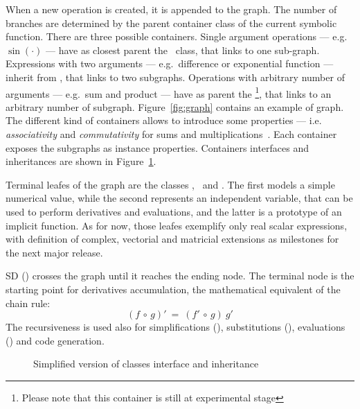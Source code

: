 When a new operation is created, it is appended to the graph. The number of branches are determined by the parent container class of the current symbolic function. There are three possible containers. Single argument operations --- e.g. $\sin(\cdot)$ --- have as closest parent the \CASOp~class, that links to one sub-graph. Expressions with two arguments --- e.g.\ difference or exponential function --- inherit from \CASBinaryOp, that links to two subgraphs. Operations with arbitrary number of arguments --- e.g.\ sum and product --- have as parent the \CASNaryOp\footnote{Please note that this container is still at experimental stage}, that links to an arbitrary number of subgraph. Figure~\ref{fig:graph} contains an example of graph. The different kind of containers allows to introduce some properties --- i.e. \emph{associativity} and \emph{commutativity} for sums and multiplications~\cite{cohen2003computer}. Each container exposes the subgraphs as instance properties. Containers interfaces and inheritances are shown in Figure~\ref{fig:uml-container}. %

Terminal leafes of the graph are the classes \CASConstant, \CASVariable~and \CASFunction. The first models a simple numerical value, while the second represents an independent variable, that can be used to perform derivatives and evaluations, and the latter is a prototype of an implicit function. As for now, those leafes exemplify only real scalar expressions, with definition of complex, vectorial and matricial extensions as milestones for the next major release.

SD (\CASOpdiff) crosses the graph until it reaches the ending node. The terminal node is the starting point for derivatives accumulation, the mathematical equivalent of the chain rule:
\begin{equation}
\left( f  \, \circ \, g \right)' \: = \:
\left( f' \, \circ \, g \right) \: g'
\end{equation}
The recursiveness is used also for simplifications (\CASOpsimplify), substitutions (\CASOpsubs), evaluations (\CASOpcall) and code generation.

\begin{figure}[ht!]
\label{fig:uml-container}
\centering

\caption{Simplified version of classes interface and inheritance}
\end{figure}

